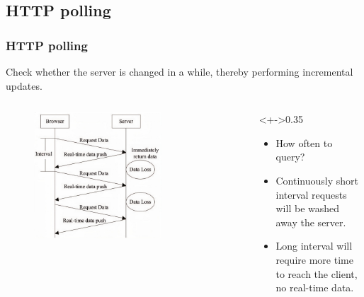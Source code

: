 \documentclass{beamer}
\begin{document}
\subsection{HTTP polling}
\begin{frame}
    \frametitle{HTTP polling}
    Check whether the server is changed in a while, thereby performing incremental updates.
    \begin{columns}
        \begin{column}{0.7\textwidth}
            \begin{figure}
                \includegraphics[width=0.7\textwidth]{images/polling.jpeg}
            \end{figure}
        \end{column}
        \begin{column}<+->{0.35\textwidth}
            \begin{itemize}[<+->]
                \item How often to query?
                \item Continuously \alert{short interval} requests will be \alert{washed away} the
                      server. 
                \item \alert{Long interval} will require more time to reach the client, \alert{no real-time} data.
            \end{itemize}
        \end{column}
    \end{columns}
\end{frame}
\end{document}
